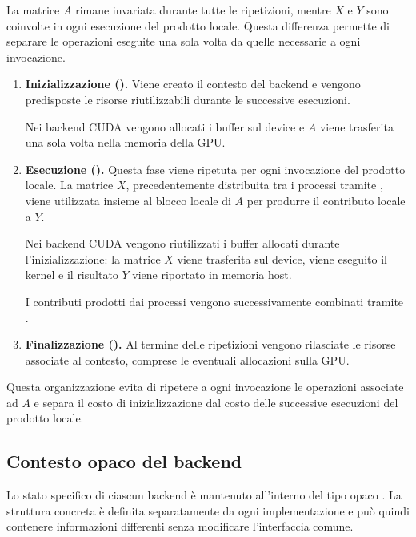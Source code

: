 La matrice $A$ rimane invariata durante tutte le ripetizioni, mentre
$X$ e $Y$ sono coinvolte in ogni esecuzione del prodotto locale.
Questa differenza permette di separare le operazioni eseguite una sola
volta da quelle necessarie a ogni invocazione.

\begin{enumerate}

    \item \textbf{Inizializzazione ().}
    Viene creato il contesto del backend e vengono predisposte le
    risorse riutilizzabili durante le successive esecuzioni.
    
    Nei backend CUDA vengono allocati i buffer sul device e
    $A$ viene trasferita una sola volta nella memoria della GPU.
        

    \item \textbf{Esecuzione ().}
    Questa fase viene ripetuta per ogni invocazione del prodotto
    locale. La matrice $X$, precedentemente distribuita tra i processi tramite
    , viene utilizzata insieme al blocco locale di $A$
    per produrre il contributo locale a $Y$.
    
    Nei backend CUDA vengono riutilizzati i buffer allocati durante
    l'inizializzazione: la matrice $X$ viene trasferita sul device, viene eseguito
    il kernel e il risultato $Y$ viene riportato in memoria host.
    
    I contributi prodotti dai processi vengono successivamente
    combinati tramite .

    \item \textbf{Finalizzazione ().}
    Al termine delle ripetizioni vengono rilasciate le risorse
    associate al contesto, comprese le eventuali allocazioni sulla GPU.

\end{enumerate}

Questa organizzazione evita di ripetere a ogni invocazione le
operazioni associate ad $A$ e separa il costo di inizializzazione
dal costo delle successive esecuzioni del prodotto locale.

\subsection{Contesto opaco del backend}

Lo stato specifico di ciascun backend è mantenuto all'interno del 
tipo opaco . La struttura concreta è definita
separatamente da ogni implementazione e può quindi contenere
informazioni differenti senza modificare l'interfaccia comune.

